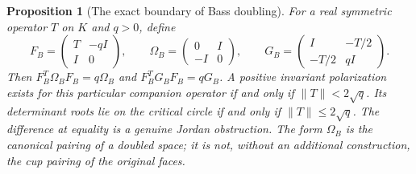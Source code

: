\documentclass[11pt,a4paper]{article}
\newtheorem{proposition}[definition]{Proposition}
\theoremstyle{remark}\newtheorem{remark}[definition]{Remark}
\begin{document}
\begin{proposition}[The exact boundary of Bass doubling]\label{prop:bass-double}
For a real symmetric operator $T$ on $K$ and $q>0$, define
\[
F_B=\begin{pmatrix}T&-qI\\I&0\end{pmatrix},\qquad
\Omega_B=\begin{pmatrix}0&I\\-I&0\end{pmatrix},\qquad
G_B=\begin{pmatrix}I&-T/2\\-T/2&qI\end{pmatrix}.
\]
Then $F_B^T\Omega_BF_B=q\Omega_B$ and $F_B^TG_BF_B=qG_B$. A positive invariant polarization exists for this \emph{particular companion operator} if and only if $\|T\|<2\sqrt q$. Its determinant roots lie on the critical circle if and only if $\|T\|\le2\sqrt q$. The difference at equality is a genuine Jordan obstruction. The form $\Omega_B$ is the canonical pairing of a doubled space; it is not, without an additional construction, the cup pairing of the original faces.
\end{proposition}
\end{document}
